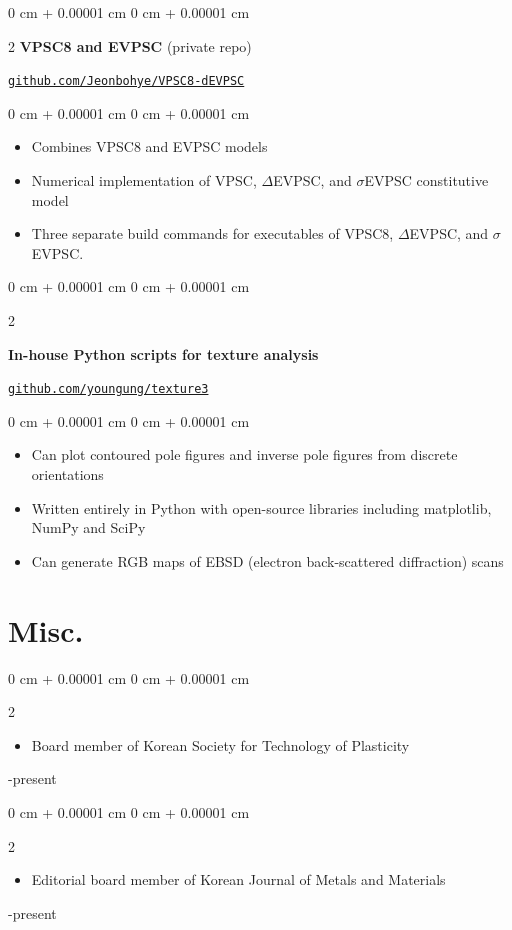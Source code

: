 \documentclass[10pt, letterpaper]{article}
\newenvironment{highlights}{
    \begin{itemize}[
        topsep=0.10 cm,
        parsep=0.10 cm,
        partopsep=0pt,
        itemsep=0pt,
        leftmargin=0 cm + 10pt
    ]
}{
    \end{itemize}
} %
\newenvironment{onecolentry}{
    \begin{adjustwidth}{
        0 cm + 0.00001 cm
    }{
        0 cm + 0.00001 cm
    }
}{
    \end{adjustwidth}
} %
\newenvironment{twocolentry}[2][]{
    \onecolentry
    \def\secondColumn{#2}
    \setcolumnwidth{\fill, 4.5 cm}
    \begin{paracol}{2}
}{
    \switchcolumn \raggedleft \secondColumn
    \end{paracol}
    \endonecolentry
} %
\begin{document}
        \begin{twocolentry}{\href{https://github.com/Jeonbohye/VPSC8-dEVPSC}{\nolinkurl{github.com/Jeonbohye/VPSC8-dEVPSC}}}\textbf{VPSC8 and EVPSC} (private repo)
        \end{twocolentry}
        \begin{onecolentry}
            \begin{highlights}
                \item Combines VPSC8 and EVPSC models
                \item Numerical implementation of VPSC, $\Delta$EVPSC, and $\sigma$EVPSC constitutive model
                \item Three separate build commands for executables of VPSC8, $\Delta$EVPSC, and $\sigma$EVPSC.
            \end{highlights}
        \end{onecolentry}
        \vspace{0.4 cm}

        \begin{twocolentry}{\href{https://github.com/youngung/texture3}{\nolinkurl{github.com/youngung/texture3}}}
            \textbf{In-house Python scripts for texture analysis}
        \end{twocolentry}
        \begin{onecolentry}
            \begin{highlights}
                \item Can plot contoured pole figures and inverse pole figures from discrete orientations
                \item Written entirely in Python with open-source libraries including matplotlib, NumPy and SciPy
                \item Can generate RGB maps of EBSD (electron back-scattered diffraction) scans
            \end{highlights}
        \end{onecolentry}
        \vspace{0.4 cm}

        \section{Misc.}
        \begin{twocolentry}{2023-present}
          \begin{highlights}
          \item Board member of Korean Society for Technology of Plasticity
          \end{highlights}
        \end{twocolentry}
        \vspace{0.2 cm}
        \begin{twocolentry}{2019-present}
          \begin{highlights}
          \item Editorial board member of Korean Journal of Metals and Materials
          \end{highlights}
        \end{twocolentry}
        \vspace{0.2 cm}
\end{document}
